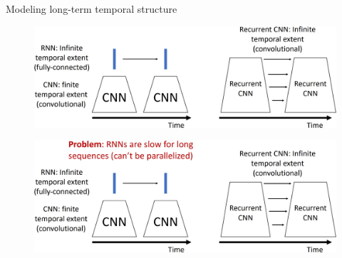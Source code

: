\begin{frame}[allowframebreaks]{Modeling long-term temporal structure}
    \begin{figure}
        \centering
        \includegraphics[width=1\textwidth,height=0.9\textheight,keepaspectratio]{images/video/slide_31_1_img.jpg}
    \end{figure}
\framebreak
    \begin{figure}
        \centering
        \includegraphics[width=1\textwidth,height=0.9\textheight,keepaspectratio]{images/video/slide_32_1_img.jpg}
    \end{figure}
\end{frame}